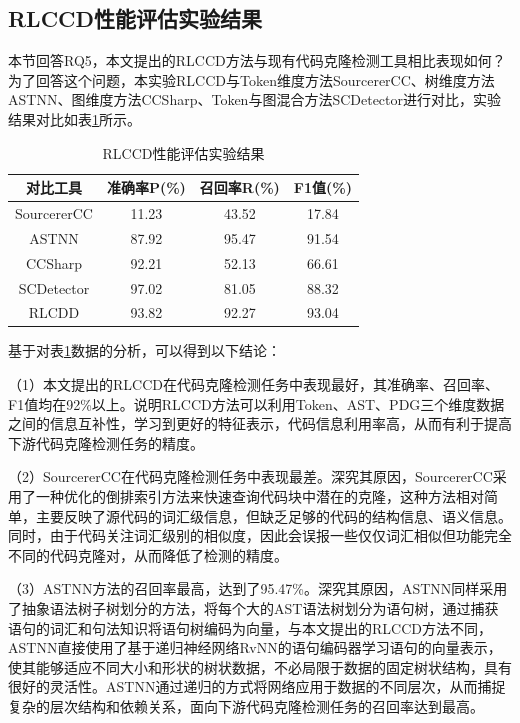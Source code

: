 \subsection{RLCCD性能评估实验结果}

本节回答RQ5，本文提出的RLCCD方法与现有代码克隆检测工具相比表现如何？为了回答这个问题，本实验RLCCD与Token维度方法SourcererCC、树维度方法ASTNN、图维度方法CCSharp、Token与图混合方法SCDetector进行对比，实验结果对比如表\ref{tab:RLCCD}所示。

\begin{table}[htp]
  \centering
  \caption{RLCCD性能评估实验结果}
  \label{tab:RLCCD}
  \begin{tabular*}{0.9\textwidth}{@{\extracolsep{\fill}}cccc}
  \toprule
    对比工具		& 准确率P(\%) & 召回率R(\%) & F1值(\%)  \\ 
  \midrule
    SourcererCC		& 11.23	  & 43.52		& 17.84 \\
    ASTNN			    & 87.92		& 95.47		& 91.54 \\
    CCSharp			  & 92.21	  & 52.13	  & 66.61 \\
    SCDetector		& 97.02	  & 81.05		& 88.32 \\
    RLCDD			    & 93.82		& 92.27		& 93.04  \\
  \bottomrule
  \end{tabular*}
\end{table}


基于对表\ref{tab:RLCCD}数据的分析，可以得到以下结论：

（1）本文提出的RLCCD在代码克隆检测任务中表现最好，其准确率、召回率、F1值均在92\%以上。说明RLCCD方法可以利用Token、AST、PDG三个维度数据之间的信息互补性，学习到更好的特征表示，代码信息利用率高，从而有利于提高下游代码克隆检测任务的精度。

（2）SourcererCC在代码克隆检测任务中表现最差。深究其原因，SourcererCC采用了一种优化的倒排索引方法来快速查询代码块中潜在的克隆，这种方法相对简单，主要反映了源代码的词汇级信息，但缺乏足够的代码的结构信息、语义信息。同时，由于代码关注词汇级别的相似度，因此会误报一些仅仅词汇相似但功能完全不同的代码克隆对，从而降低了检测的精度。

（3）ASTNN方法的召回率最高，达到了95.47\%。深究其原因，ASTNN同样采用了抽象语法树子树划分的方法，将每个大的AST语法树划分为语句树，通过捕获语句的词汇和句法知识将语句树编码为向量，与本文提出的RLCCD方法不同，ASTNN直接使用了基于递归神经网络RvNN的语句编码器学习语句的向量表示，使其能够适应不同大小和形状的树状数据，不必局限于数据的固定树状结构，具有很好的灵活性。ASTNN通过递归的方式将网络应用于数据的不同层次，从而捕捉复杂的层次结构和依赖关系，面向下游代码克隆检测任务的召回率达到最高。

